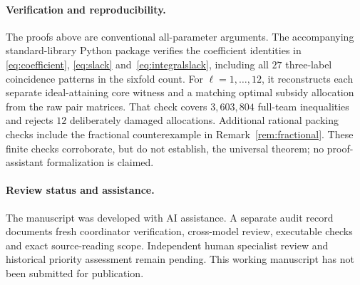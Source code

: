 \documentclass[11pt]{article}
\theoremstyle{remark}
\begin{document}
\paragraph{Verification and reproducibility.}
The proofs above are conventional all-parameter arguments. The accompanying
standard-library Python package verifies the coefficient identities in
\eqref{eq:coefficient}, \eqref{eq:slack} and~\eqref{eq:integralslack},
including all $27$ three-label coincidence patterns in the sixfold count.
For $\ell=1,\ldots,12$, it reconstructs each separate ideal-attaining
core witness and a matching optimal subsidy allocation from the raw pair
matrices. That check covers $3{,}603{,}804$ full-team inequalities and rejects
$12$ deliberately damaged allocations. Additional rational packing checks
include the fractional counterexample in Remark~\ref{rem:fractional}.
These finite checks corroborate, but do not establish, the universal theorem;
no proof-assistant formalization is claimed.

\paragraph{Review status and assistance.}
The manuscript was developed with AI assistance. A separate audit record
documents fresh coordinator verification, cross-model review, executable
checks and exact source-reading scope. Independent human specialist review
and historical priority assessment remain pending. This working manuscript
has not been submitted for publication.
\end{document}
